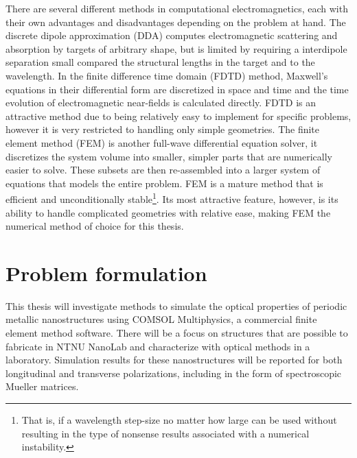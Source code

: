 There are several different methods in computational electromagnetics, each with their own advantages and disadvantages depending on the problem at hand. The discrete dipole approximation (DDA) computes electromagnetic scattering and absorption by targets of arbitrary shape, but is limited by requiring a interdipole separation small compared the structural lengths in the target and to the wavelength\cite{DDA}. In the finite difference time domain (FDTD) method, Maxwell's equations in their differential form are discretized in space and time and the time evolution of electromagnetic near-fields is calculated directly\cite{FDTD}. FDTD is an attractive method due to being relatively easy to implement for specific problems, however it is very restricted to handling only simple geometries. The finite element method (FEM) is another full-wave differential equation solver, it discretizes the system volume into smaller, simpler parts that are numerically easier to solve. These subsets are then re-assembled into a larger system of equations that models the entire problem\cite{FEM_in_EM_jianming_jin}. FEM is a mature method that is efficient and unconditionally stable\footnote{That is, if a wavelength step-size no matter how large can be used without resulting in the type of nonsense results associated with a numerical instability.}\cite{CEM_course}. Its most attractive feature, however, is its ability to handle complicated geometries with relative ease, making FEM the numerical method of choice for this thesis. 



\section{Problem formulation}
This thesis will investigate methods to simulate the optical properties of periodic metallic nanostructures using COMSOL Multiphysics, a commercial finite element method software. There will be a focus on structures that are possible to fabricate in NTNU NanoLab and characterize with optical methods in a laboratory. Simulation results for these nanostructures will be reported for both longitudinal and transverse polarizations, including in the form of spectroscopic Mueller matrices.

